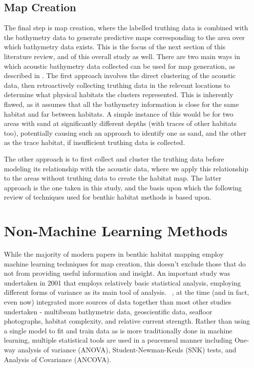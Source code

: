 \subsection{Map Creation}
The final step is map creation, where the labelled truthing data is combined with the bathymetry data to generate predictive maps corresponding to the area over which bathymetry data exists. This is the focus of the next section of this literature review, and of this overall study as well. There are two main ways in which acoustic bathymetry data collected can be used for map generation, as described in \citet{ahsan11}. The first approach involves the direct clustering of the acoustic data, then retroactively collecting truthing data in the relevant locations to determine what physical habitats the clusters represented. This is inherently flawed, as it assumes that all the bathymetry information is close for the same habitat and far between habitats. A simple instance of this would be for two areas with sand at significantly different depths (with traces of other habitats too), potentially causing such an approach to identify one as sand, and the other as the trace habitat, if insufficient truthing data is collected. 

The other approach is to first collect and cluster the truthing data before modeling its relationship with the acoustic data, where we apply this relationship to the areas without truthing data to create the habitat map. The latter approach is the one taken in this study, and the basis upon which the following review of techniques used for benthic habitat methods is based upon.


\section{Non-Machine Learning Methods}
 While the majority of modern papers in benthic habitat mapping employ machine learning techniques for map creation, this doesn't exclude those that do not from providing useful information and insight. An important study was undertaken in 2001 that employs relatively basic statistical analysis, employing different forms of variance as its main tool of analysis. ~\citep{kostylev01}, at the time (and in fact, even now) integrated more sources of data together than most other studies undertaken - multibeam bathymetric data, geoscientific data, seafloor photographs, habitat complexity, and relative current strength. Rather than using a single model to fit and train data as is more traditionally done in machine learning, multiple statistical tools are used in a peacemeal manner including One-way analysis of variance (ANOVA), Student-Newman-Keuls (SNK) tests, and Analysis of Covariance (ANCOVA). 

